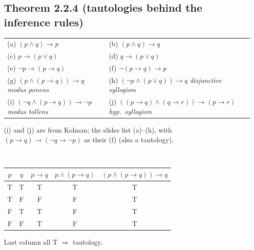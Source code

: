 \documentclass{fkt-notes}
\theoremstyle{definition}
\begin{document}
\subsection{Theorem 2.2.4 (tautologies behind the inference rules)}
%
\begin{rulepar}
  \begin{tabular}{@{}ll@{}}
    (a) $(p\wedge q)\to p$                                          & (b) $(p\wedge q)\to q$  \\
    (c) $p\to(p\vee q)$                                             & (d) $q\to(p\vee q)$     \\
    (e) $\neg p\to(p\to q)$                                         & (f) $\neg(p\to q)\to p$ \\
    (g) $(p\wedge(p\to q))\to q$ \quad\emph{modus ponens}           &
    (h) $(\neg p\wedge(p\vee q))\to q$ \quad\emph{disjunctive syllogism}                      \\
    (i) $(\neg q\wedge(p\to q))\to\neg p$ \quad\emph{modus tollens} &
    (j) $((p\to q)\wedge(q\to r))\to(p\to r)$ \quad\emph{hyp.\ syllogism}
  \end{tabular}
\end{rulepar}

(i) and (j) are from Kolman; the slides list (a)--(h), with
$(p\to q)\to(\neg q\to\neg p)$ as their (f) (also a tautology).

\begin{example}[verifying (g)]\leavevmode\\[2pt]
  \begin{tabular}[t]{@{}cc|cc|c@{}}
    $p$ & $q$ & $p\to q$ & $p\wedge(p\to q)$ & $(p\wedge(p\to q))\to q$ \\\hline
    T   & T   & T        & T                 & T                        \\ T&F&F&F&T\\ F&T&T&F&T\\ F&F&T&F&T
  \end{tabular}
  \quad Last column all T $\Rightarrow$ tautology.
\end{example}
\end{document}
